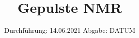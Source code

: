



\subject{V49}  %
\title{Gepulste NMR} %
\date{%
  Durchführung: 14.06.2021
  \hspace{3em}
  Abgabe: DATUM
}



\maketitle
\thispagestyle{empty}
\tableofcontents
\newpage







\printbibliography{}


